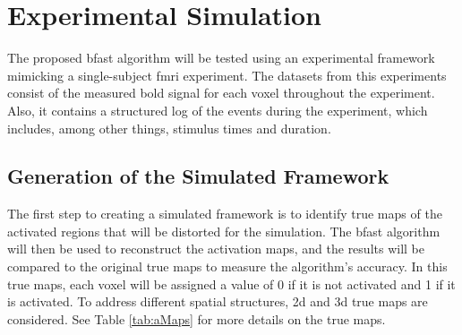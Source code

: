 \chapter{Experimental Simulation}  

The proposed \gls{bfast} algorithm will be tested using an experimental framework 
mimicking a single-subject \gls{fmri} experiment. The datasets from this 
experiments consist of the measured \gls{bold} signal for each voxel throughout 
the experiment. Also, it contains a structured log of the events during the experiment, 
which includes, among other things, stimulus times and duration. 

\section{Generation of the Simulated Framework}

The first step to creating a simulated framework is to identify true maps of the 
activated regions that will be distorted for the simulation. The \gls{bfast} algorithm 
will then be used to reconstruct the activation maps, and the results will be compared to 
the original true maps to measure the algorithm's accuracy. In this true maps, each voxel 
will be assigned a value of 0 if it is not activated and 1 if it is activated. To address 
different spatial structures, \gls{2d} and \gls{3d} true maps are considered. 
See Table \ref{tab:aMaps} for more details on the true maps.

